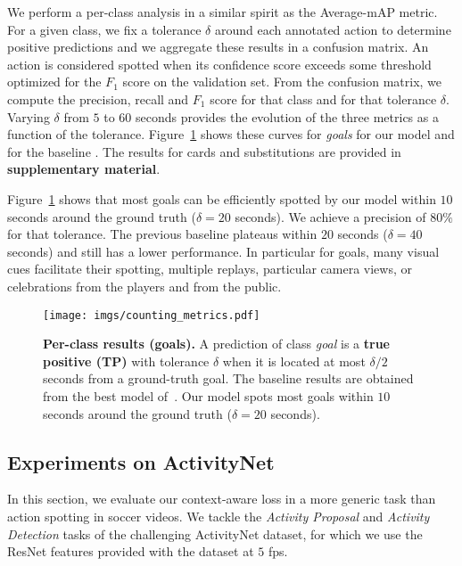\documentclass[10pt,twocolumn,letterpaper]{article}
\begin{document}
We perform a per-class analysis in a similar spirit as the Average-mAP metric. For a given class, we fix a tolerance $\delta$ around each annotated action to determine positive predictions and we aggregate these results in a confusion matrix. An action is considered spotted when its confidence score exceeds some threshold optimized for the $F_1$ score on the validation set. From the confusion matrix, we compute the precision, recall and $F_1$ score for that class and for that tolerance $\delta$. Varying $\delta$ from $5$ to $60$ seconds provides the evolution of the three metrics as a function of the tolerance. Figure~\ref{fig:goalmetrics} shows these curves for \emph{goals} for our model and for the baseline \cite{Giancola_2018_CVPR_Workshops}. The results for cards and substitutions are provided in \textbf{supplementary material}.


Figure~\ref{fig:goalmetrics} shows that most goals can be efficiently spotted by our model within $10$ seconds around the ground truth ($\delta=20$ seconds). We achieve a precision of $80\%$ for that tolerance. The previous baseline plateaus within $20$ seconds ($\delta=40$ seconds) and still has a lower performance. In particular for goals, many visual cues facilitate their spotting, \eg multiple replays, particular camera views, or celebrations from the players and from the public. 


\begin{figure}
    \centering
    \texttt{[image: imgs/counting\_metrics.pdf]}\\
    \caption{\textbf{Per-class results (goals).} A prediction of class \emph{goal} is a {\color{anthoblue}\textbf{true positive (TP)}} with tolerance $\delta$ when it is located at most $\delta/2$ seconds from a ground-truth goal. The baseline results are obtained from the best model of~\cite{Giancola_2018_CVPR_Workshops}. Our model spots most goals within $10$ seconds around the ground truth ($\delta=20$ seconds).
    }
    \label{fig:goalmetrics}
\end{figure}





\subsection{Experiments on ActivityNet}

In this section, we evaluate our context-aware loss in a more generic task than action spotting in soccer videos. We tackle the \emph{Activity Proposal} and \emph{Activity Detection} tasks of the challenging ActivityNet dataset, for which we use the ResNet features provided with the dataset at $5$ fps. 
\end{document}
